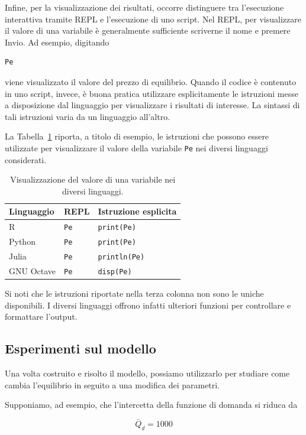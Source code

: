 Infine, per la visualizzazione dei risultati, occorre distinguere tra l'esecuzione interattiva tramite REPL e
l'esecuzione di uno script. Nel REPL, per visualizzare il valore di una
variabile è generalmente sufficiente scriverne il nome e premere Invio. Ad
esempio, digitando
\begin{verbatim}
Pe
\end{verbatim}
viene visualizzato il valore del prezzo di equilibrio. Quando il codice
è contenuto in uno script, invece, è buona pratica utilizzare esplicitamente
le istruzioni messe a disposizione dal linguaggio per visualizzare i risultati
di interesse. La sintassi di tali istruzioni varia da un linguaggio all'altro.

La Tabella~\ref{tab:output_software} riporta, a titolo di esempio, le
istruzioni che possono essere utilizzate per visualizzare il valore della
variabile \verb+Pe+ nei diversi linguaggi considerati.

\begin{table}[ht]
\centering
\caption{Visualizzazione del valore di una variabile nei diversi linguaggi.}
\label{tab:output_software}
\begin{tabular}{lll}
\hline
\textbf{Linguaggio} & \textbf{REPL} & \textbf{Istruzione esplicita} \\
\hline
R         & \verb+Pe+ & \verb+print(Pe)+ \\
Python    & \verb+Pe+ & \verb+print(Pe)+ \\
Julia     & \verb+Pe+ & \verb+println(Pe)+ \\
GNU Octave & \verb+Pe+ & \verb+disp(Pe)+ \\
\hline
\end{tabular}
\end{table}

Si noti che le istruzioni riportate nella terza colonna non sono le uniche
disponibili. I diversi linguaggi offrono infatti ulteriori funzioni per
controllare e formattare l'output.

\subsection{Esperimenti sul modello}

Una volta costruito e risolto il modello, possiamo utilizzarlo per
studiare come cambia l'equilibrio in seguito a una modifica dei
parametri.

Supponiamo, ad esempio, che l'intercetta della funzione di domanda
si riduca da

\begin{equation*}
    \bar{Q}_d = 1000
\end{equation*}

